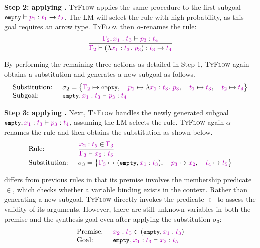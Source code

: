 \documentclass[manuscript,screen]{acmart}
\newcommand{\stlctype}[3]{{#1} \vdash {#2} : {#3}}
\newcommand{\sk}[1]{\textcolor{skunknown}{#1}}
\newcommand{\toolname}[1]{\textsc{#1}}
\newcommand{\tcode}[1]{{\small \texttt{\spaceskip=0.2em #1}}}
\newcommand{\mainname}{\toolname{TyFlow}\xspace}
\begin{document}
\smallskip \noindent \textbf{Step 2: applying .}
\mainname applies the same procedure to the first subgoal $\stlctype{\tcode{empty}}{\sk{p_1}}{\arr{\sk{t_1}}{\sk{t_2}}}$. 
%
The LM will select the     {\color{revblue}rule with high probability, } as this goal requires an arrow type.
\mainname then $\alpha$-renames the  rule:
$$
\frac{
    \stlctype{\snoc{\sk{\Gamma_2}}{\sk{x_1}}{\sk{t_3}}}{\sk{p_3}}{\sk{t_4}}
}{
    \stlctype{\sk{\Gamma_2}}{\left(\abs{\sk{x_1}}{\sk{t_3}}{\sk{p_3}}\right)}{\arr{\sk{t_3}}{\sk{t_4}}}
}
$$

By performing the remaining three actions as detailed in Step 1, \mainname again obtains a substitution and generates a new subgoal as follows.
$$\begin{array}{ll}
\textrm{Substitution: } & \sigma_2 = \big\{ \sk{\Gamma_2} \mapsto \tcode{empty}, \quad \sk{p_1} \mapsto \abs{\sk{x_1}}{\sk{t_3}}{\sk{p_3}}, \quad \sk{t_1} \mapsto \sk{t_3}, \quad \sk{t_2} \mapsto \sk{t_4}\big\}\\
\textrm{Subgoal: }& \stlctype{\snoc{\tcode{empty}}{\sk{x_1}}{\sk{t_3}}}{\sk{p_3}}{\sk{t_4}}
\end{array}$$

\smallskip \noindent \textbf{Step 3: applying .}
Next, \mainname handles the newly generated subgoal $\stlctype{\snoc{\tcode{empty}}{\sk{x_1}}{\sk{t_3}}}{\sk{p_3}}{\sk{t_4}}$, assuming the LM selects the  rule. \mainname again $\alpha$-renames the rule and then obtains the substitution as shown below.
$$\begin{array}{ll}
\textrm{Rule: } & \displaystyle\frac{\checkBinding{\sk{\Gamma_3}}{\sk{x_2}}{\sk{t_5}}}{\stlctype{\sk{\Gamma_3}}{\vari{\sk{x_2}}}{\sk{t_5}}}\\[0.8em]
\textrm{Substitution: } & \sigma_3=\big\{ \sk{\Gamma_3} \mapsto (\snoc{\tcode{empty}}{\sk{x_1}}{\sk{t_3}}), \quad \sk{p_3} \mapsto \vari{\sk{x_2}}, \quad \sk{t_4} \mapsto \sk{t_5}\big\}
\end{array}$$

 differs from previous rules in that its premise involves the membership predicate $\in$, which checks whether a variable binding exists in the context.
%
Rather than generating a new subgoal, \mainname directly invokes the predicate $\in$ to assess the validity of its arguments.
%
However, there are still unknown variables in both the premise and the synthesis goal even after applying the substitution $\sigma_3$:
$$\begin{array}{ll}
\textrm{Premise: } & \checkBinding{(\snoc{\tcode{empty}}{\sk{x_1}}{\sk{t_3}})}{\sk{x_2}}{\sk{t_5}}\\
\textrm{Goal: } & \stlctype{\snoc{\tcode{empty}}{\sk{x_1}}{\sk{t_3}}}{\sk{x_2}}{\sk{t_5}}
\end{array}$$
\end{document}
